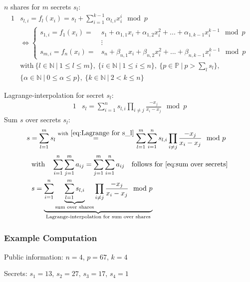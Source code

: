 $n$ shares for $m$ secrets $s_l$:
\begin{alignat}{1}
&s_{l,i} = f_l(x_i) = s_l + \sum_{i=1}^{k-1} \alpha_{l,i} x_i^i \mod p \\
& \Leftrightarrow \begin{cases}
s_{1,i} = f_1(x_i) = & s_1 + \alpha_{1,1} x_i + \alpha_{1,2} x_i^2 + ... + \alpha_{1,k-1}x_i^{k-1} \mod p \\
&\vdots \\
s_{m,i} = f_n(x_i) = & s_n + \beta_{n,1} x_i + \beta_{n,2} x_i^2 + ... + \beta_{n,k-1}x_i^{k-1} \mod p
\end{cases} \nonumber \\
& \text{with} \ \{l \in \mathbb{N} \ | \ 1 \leq l \leq m \},
\ \{i \in \mathbb{N} \ | \ 1 \leq i \leq n \},
\ \{ p \in \mathbb{P} \ | \ p > \sum_l s_l \}, \nonumber \\
&\{ \alpha \in \mathbb{N} \ | \ 0 \leq \alpha \leq p \},
\ \{k \in \mathbb{N} \ | \ 2 < k \leq n \} \nonumber
\end{alignat}

Lagrange-interpolation for secret $s_l$:
\begin{alignat}{1}
&s_l = \sum_{i=1}^{n}s_{l,i}\prod_{i\neq j}\frac{-x_j}{x_i - x_j} \mod p \label{eq:Lagrange for s_l}
\end{alignat}
Sum $s$ over secrets $s_l$:
\begin{alignat}{1}
&s = \sum_{l=1}^{m} s_l \overset{\text{with} \ \ref{eq:Lagrange for s_l}}{=} \sum_{l=1}^{m} \sum_{i=1}^{n} s_{l,i}\prod_{i\neq j} \frac{-x_j}{x_i-x_j} \mod p \label{eq:sum over secrets}
\end{alignat}
\begin{alignat}{1}
&\text{with} \quad \sum_{i=1}^{n}\sum_{j=1}^{m}a_{ij} = \sum_{j=1}^{m}\sum_{i=1}^{n}a_{ij} \quad \text{follows for \ref{eq:sum over secrets}} \nonumber\\
&s= \underbrace{ \sum_{i=1}^n \underbrace{\sum_{l=1}^{m} s_{l,i}}_{\text{sum over shares}} \prod_{i\neq j} \frac{-x_j}{x_i-x_j} \mod p }_{\text{Lagrange-interpolation for sum over shares}}
\end{alignat}	

\subsubsection*{Example Computation}
Public information: $n=4$, $p=67$, $k=4$\par

\noindent Secrets: $s_1=13$, $s_2=27$, $s_3=17$, $s_4=1$\par

